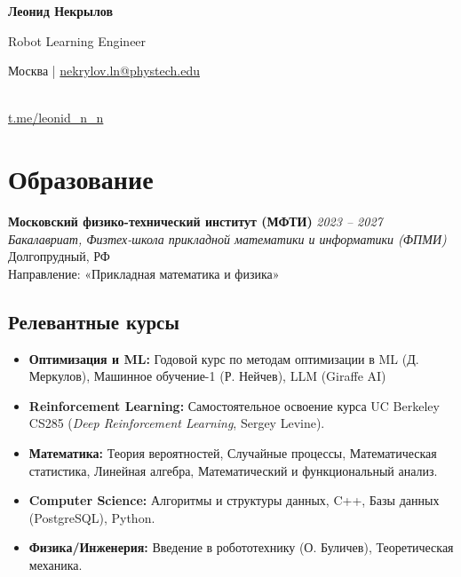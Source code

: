 \documentclass[10pt,a4paper]{article}
\begin{document}
\pagestyle{empty}


\begin{center}

{\LARGE \textbf{Леонид Некрылов}}

\vspace{0.1cm}

{\large Robot Learning Engineer}

\vspace{0.2cm}

Москва |
\href{mailto:nekrylov.ln@phystech.edu}{nekrylov.ln@phystech.edu}

\\

\href{https://t.me/leonid_n_n}{t.me/leonid\_n\_n}

\end{center}



\section*{Образование}

\textbf{Московский физико-технический институт (МФТИ)} \hfill \textit{2023 -- 2027} \\
\textit{Бакалавриат, Физтех-школа прикладной математики и информатики (ФПМИ)} \hfill Долгопрудный, РФ \\
Направление: «Прикладная математика и физика»

\subsection*{Релевантные курсы}

\vspace{0.1cm}
\begin{itemize}[leftmargin=*,nosep]
\item \textbf{Оптимизация и ML:} Годовой курс по методам оптимизации в ML (Д. Меркулов), Машинное обучение-1 (Р. Нейчев), LLM (Giraffe AI)
\item \textbf{Reinforcement Learning:} Самостоятельное освоение курса UC Berkeley CS285 (\textit{Deep Reinforcement Learning}, Sergey Levine).
\item \textbf{Математика:} Теория вероятностей, Случайные процессы, Математическая статистика, Линейная алгебра, Математический и функциональный анализ.
\item \textbf{Computer Science:} Алгоритмы и структуры данных, C++, Базы данных (PostgreSQL), Python.
\item \textbf{Физика/Инженерия:} Введение в робототехнику (О. Буличев), Теоретическая механика.
\end{itemize}
\end{document}
